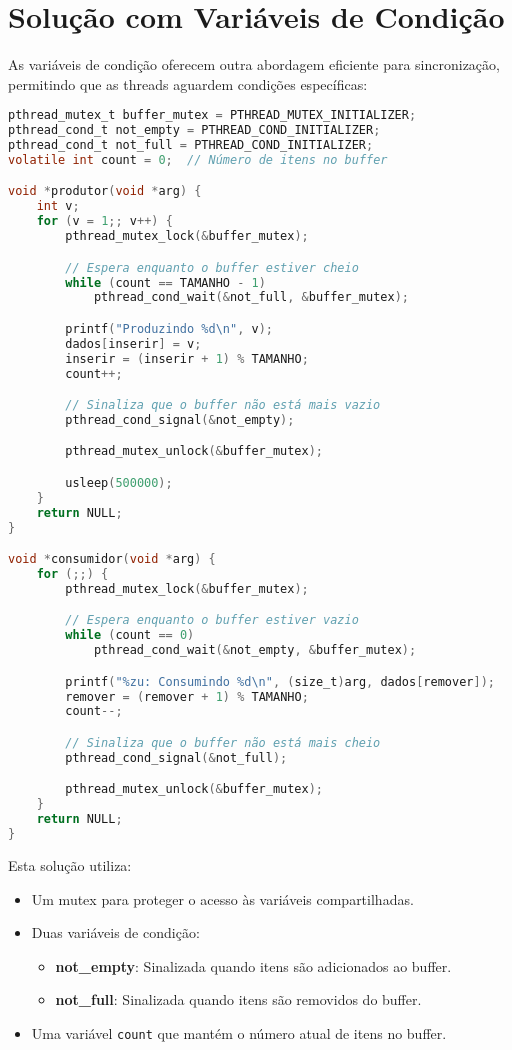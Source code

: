 \documentclass[12pt]{article}
\begin{document}
\section{Solução com Variáveis de Condição}

As variáveis de condição oferecem outra abordagem eficiente para sincronização, permitindo que as threads aguardem condições específicas:

\begin{lstlisting}[language=C]
pthread_mutex_t buffer_mutex = PTHREAD_MUTEX_INITIALIZER;
pthread_cond_t not_empty = PTHREAD_COND_INITIALIZER;
pthread_cond_t not_full = PTHREAD_COND_INITIALIZER;
volatile int count = 0;  // Número de itens no buffer

void *produtor(void *arg) {
    int v;
    for (v = 1;; v++) {
        pthread_mutex_lock(&buffer_mutex);

        // Espera enquanto o buffer estiver cheio
        while (count == TAMANHO - 1)
            pthread_cond_wait(&not_full, &buffer_mutex);

        printf("Produzindo %d\n", v);
        dados[inserir] = v;
        inserir = (inserir + 1) % TAMANHO;
        count++;

        // Sinaliza que o buffer não está mais vazio
        pthread_cond_signal(&not_empty);

        pthread_mutex_unlock(&buffer_mutex);

        usleep(500000);
    }
    return NULL;
}

void *consumidor(void *arg) {
    for (;;) {
        pthread_mutex_lock(&buffer_mutex);

        // Espera enquanto o buffer estiver vazio
        while (count == 0)
            pthread_cond_wait(&not_empty, &buffer_mutex);

        printf("%zu: Consumindo %d\n", (size_t)arg, dados[remover]);
        remover = (remover + 1) % TAMANHO;
        count--;

        // Sinaliza que o buffer não está mais cheio
        pthread_cond_signal(&not_full);

        pthread_mutex_unlock(&buffer_mutex);
    }
    return NULL;
}
\end{lstlisting}

Esta solução utiliza:
\begin{itemize}
    \item Um mutex para proteger o acesso às variáveis compartilhadas.
    \item Duas variáveis de condição:
    \begin{itemize}
        \item \textbf{not\_empty}: Sinalizada quando itens são adicionados ao buffer.
        \item \textbf{not\_full}: Sinalizada quando itens são removidos do buffer.
    \end{itemize}
    \item Uma variável \texttt{count} que mantém o número atual de itens no buffer.
\end{itemize}
\end{document}
